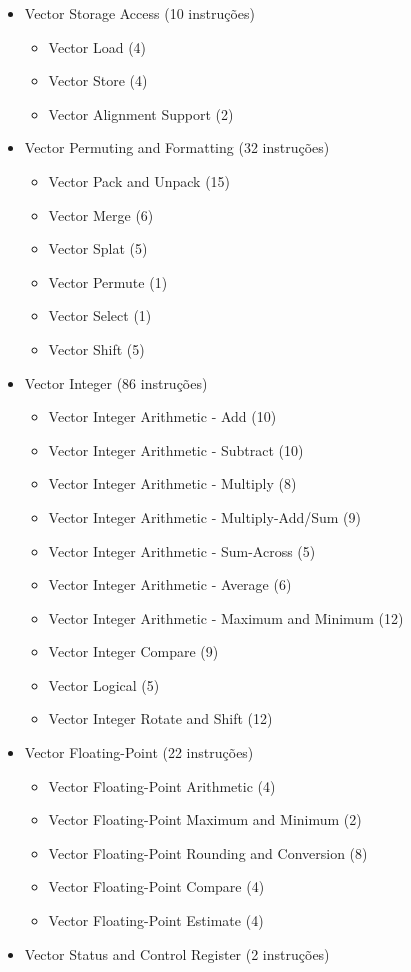 \documentclass[twocolumn]{article}
\begin{document}
\begin{itemize}
\item Vector Storage Access (10 instruções)
\begin{itemize}
  \item  Vector Load (4)
  \item  Vector Store (4)
  \item  Vector Alignment Support (2)
\end{itemize}

\item Vector Permuting and Formatting (32 instruções)
\begin{itemize}
  \item Vector Pack and Unpack (15)
  \item Vector Merge (6)
   \item Vector Splat (5)
   \item Vector Permute (1)
   \item Vector Select (1)
   \item  Vector Shift (5)
\end{itemize}

\item Vector Integer (86 instruções)
 \begin{itemize}
   \item Vector Integer Arithmetic - Add (10)
   \item Vector Integer Arithmetic - Subtract (10)
   \item Vector Integer Arithmetic - Multiply (8)
   \item Vector Integer Arithmetic - Multiply-Add/Sum (9)
   \item Vector Integer Arithmetic - Sum-Across (5)
   \item Vector Integer Arithmetic - Average (6)
   \item Vector Integer Arithmetic - Maximum and Minimum (12)
   \item Vector Integer Compare (9)
   \item Vector Logical (5)
   \item Vector Integer Rotate and Shift (12)
\end{itemize}

\item Vector Floating-Point (22 instruções)
\begin{itemize}
   \item Vector Floating-Point Arithmetic (4)
   \item Vector Floating-Point Maximum and Minimum (2)
   \item Vector Floating-Point Rounding and Conversion (8)
   \item Vector Floating-Point Compare (4)
   \item Vector Floating-Point Estimate (4)
\end{itemize}

\item Vector Status and Control Register (2 instruções)

\end{itemize}
\end{document}
